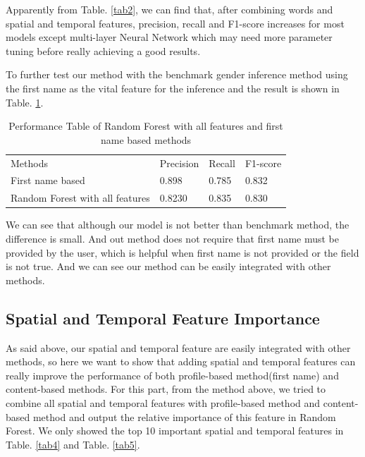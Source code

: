 \documentclass{article}
\begin{document}
Apparently from Table. \ref{tab2},   we can find that,  after combining words and spatial and temporal features, precision, recall and F1-score increases for most models except multi-layer Neural Network which may need more parameter tuning before really achieving a good results.

To further test our method with the benchmark gender inference method using the first name as the vital feature for the inference and the result is shown in Table. \ref{tab3}.

\begin{table}[tp]
\centering
\caption{Performance Table of Random Forest with all features and first name based methods}
\label{tab3}
\begin{center}
\begin{small}
\begin{sc}
\begin{tabular}{llll}
Methods                                     & Precision & Recall & F1-score \\
First name based                            & 0.898     & 0.785  & 0.832    \\
Random Forest with all features & 0.8230     & 0.835  & 0.830   
\end{tabular}
\end{sc}
\end{small}
\end{center}
\end{table}

We can see that although our model is not better than benchmark method, the difference is small.  And out method does not require that first name must be provided by the user, which is helpful when first name is not provided or the field is not true. And we can see our method can be easily integrated with other methods.

\subsection{Spatial and Temporal Feature Importance}
As said above, our spatial and temporal feature are easily integrated with other methods, so here we want to show that adding spatial and temporal features can really improve the performance of both profile-based method(first name) and content-based methods. For this part, from the method above, we tried to  combine all spatial and temporal features with profile-based method and content-based method and output the relative importance of this feature in Random Forest. We only showed the top 10 important spatial and temporal features in Table. \ref{tab4} and Table. \ref{tab5}.
\end{document}
